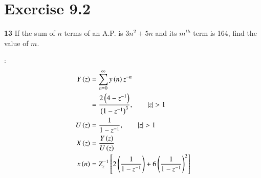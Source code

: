 \documentclass[journal,12pt,twocolumn]{IEEEtran}
\begin{document}


\vspace{3cm}

\title{}
\author{EE23BTECH11054 -  Sai Krishna Shanigarapu$^{*}$
}
\maketitle
\newpage
\bigskip


\section*{Exercise 9.2}

\noindent \textbf{13} \hspace{2pt}If the sum of $n$ terms of an A.P. is $3n^2+5n$ and its $m^{th}$ term is 164, find the value of $m$.
\bigskip

\solution:
\noindent
\begin{align}
Y\left(z\right) &=  \sum_{n=0}^{\infty} y\left(n\right)z^{-n} \\
&= \frac{2\left(4-z^{-1}\right)}{\left(1-z^{-1}\right)^3}, \qquad |z| > 1\\
U\left(z\right) &= \frac{1}{1-z^{-1}}, \qquad |z| > 1\\
X\left(z\right) &=  \frac{Y\left(z\right)}{U\left(z\right)}\\
x\left(n\right) &= Z_{z}^{-1}\left[2\left(\frac{1}{1-z^{-1}}\right) + 6\left(\frac{1}{1-z^{-1}}\right) ^2\right] \label{eq:eq11.9.2.13.1}
\end{align}
\end{document}
